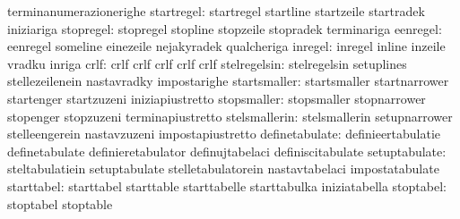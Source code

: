                                   terminanumerazionerighe
                      startregel: startregel                       startline
                                  startzeile                       startradek
                                  iniziariga
                       stopregel: stopregel                        stopline
                                  stopzeile                        stopradek
                                  terminariga
                        eenregel: eenregel                         someline
                                  einezeile                        nejakyradek
                                  qualcheriga
                         inregel: inregel                          inline
                                  inzeile                          vradku
                                  inriga
                            crlf: crlf                             crlf
                                  crlf                             crlf
                                  crlf
                    stelregelsin: stelregelsin                     setuplines
                                  stellezeilenein                  nastavradky
                                  impostarighe
                    startsmaller: startsmaller                     startnarrower
                                  startenger                       startzuzeni
                                  iniziapiustretto
                     stopsmaller: stopsmaller                      stopnarrower
                                  stopenger                        stopzuzeni
                                  terminapiustretto
                   stelsmallerin: stelsmallerin                    setupnarrower
                                  stelleengerein                   nastavzuzeni
                                  impostapiustretto
                  definetabulate: definieertabulatie               definetabulate
                                  definieretabulator               definujtabelaci
                                  definiscitabulate                %
                   setuptabulate: steltabulatiein                  setuptabulate
                                  stelletabulatorein               nastavtabelaci
                                  impostatabulate
                      starttabel: starttabel                       starttable
                                  starttabelle                     starttabulka
                                  iniziatabella
                       stoptabel: stoptabel                        stoptable
